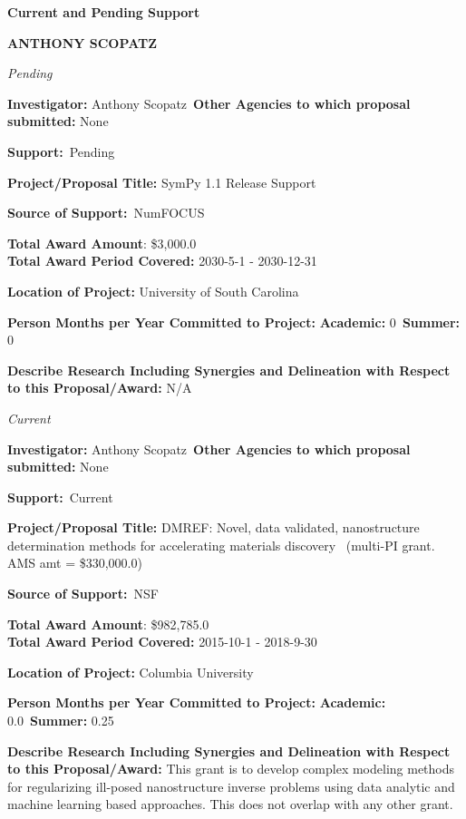 \documentclass[prl,tighten,amsmath,amssymb,floatfix]{revtex4-1}
\begin{document}
\textbf{Current and Pending Support}

\textbf{ANTHONY SCOPATZ}
\vskip 14pt


\textit{Pending}

\vskip 12pt\noindent
\textbf{Investigator:} Anthony Scopatz\
\textbf{Other Agencies to which proposal submitted:}
None

\textbf{Support:}\ Pending

\textbf{Project/Proposal Title:}  SymPy 1.1 Release Support

\textbf{Source of Support:}\
NumFOCUS

\textbf{Total Award Amount}:
\$3,000.0\\
\textbf{ Total Award Period Covered:}
2030-5-1 - 2030-12-31

\textbf{Location of Project:} University of South Carolina

\textbf{Person Months per Year Committed to Project:}
\textbf{Academic:} 0\
\textbf{Summer:} 0

\textbf{Describe Research Including Synergies and Delineation with
Respect to this Proposal/Award:} N/A

\vskip 14pt


\textit{Current}

\vskip 12pt\noindent
\textbf{Investigator:} Anthony Scopatz\
\textbf{Other Agencies to which proposal submitted:}
None

\textbf{Support:}\ Current

\textbf{Project/Proposal Title:}  DMREF: Novel, data validated, nanostructure determination methods for accelerating materials discovery
\ (multi-PI grant.  AMS
amt = \$330,000.0)


\textbf{Source of Support:}\
NSF

\textbf{Total Award Amount}:
\$982,785.0\\
\textbf{ Total Award Period Covered:}
2015-10-1 - 2018-9-30

\textbf{Location of Project:} Columbia University

\textbf{Person Months per Year Committed to Project:}
\textbf{Academic:} 0.0\
\textbf{Summer:} 0.25

\textbf{Describe Research Including Synergies and Delineation with
Respect to this Proposal/Award:} This grant is to develop complex modeling methods for regularizing ill-posed nanostructure inverse problems using data analytic and machine learning based approaches. This does not overlap with any other grant.

\vskip 14pt
\end{document}
